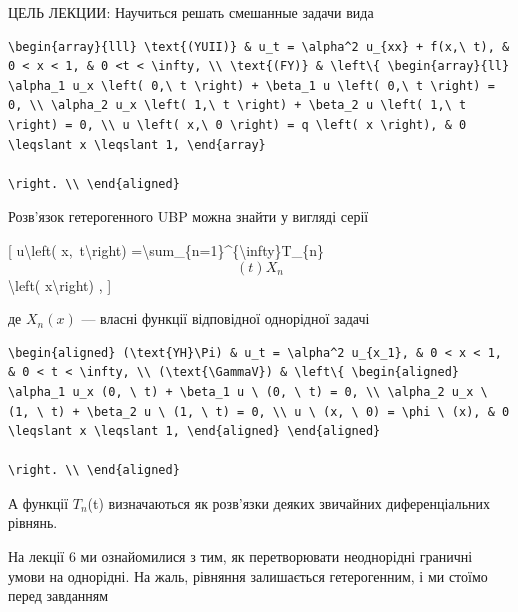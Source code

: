 \documentclass[
]{article}
\begin{document}
{{ЦЕЛЬ ЛЕКЦИИ: Научиться решать смешанные задачи вида

\begin{verbatim}
\begin{array}{lll} \text{(YUII)} & u_t = \alpha^2 u_{xx} + f(x,\ t), & 0 < x < 1, & 0 <t < \infty, \\ \text{(FY)} & \left\{ \begin{array}{ll} \alpha_1 u_x \left( 0,\ t \right) + \beta_1 u \left( 0,\ t \right) = 0, \\ \alpha_2 u_x \left( 1,\ t \right) + \beta_2 u \left( 1,\ t \right) = 0, \\ u \left( x,\ 0 \right) = q \left( x \right), & 0 \leqslant x \leqslant 1, \end{array}

\right. \\ \end{aligned}
\end{verbatim}

Розв'язок гетерогенного UBP можна знайти у вигляді серії

{[} u\textbackslash left( x,~t\textbackslash right)
=\textbackslash sum\_\{n=1\}\^{}\{\textbackslash infty\}T\_\{n\}\[\left( t\right)X_{n}\]\textbackslash left(
x\textbackslash right) , {]}

де \(X_n\left(x\right)\) --- власні функції відповідної однорідної
задачі

\begin{verbatim}
\begin{aligned} (\text{YH}\Pi) & u_t = \alpha^2 u_{x_1}, & 0 < x < 1, & 0 < t < \infty, \\ (\text{\GammaV}) & \left\{ \begin{aligned} \alpha_1 u_x (0, \ t) + \beta_1 u \ (0, \ t) = 0, \\ \alpha_2 u_x \ (1, \ t) + \beta_2 u \ (1, \ t) = 0, \\ u \ (x, \ 0) = \phi \ (x), & 0 \leqslant x \leqslant 1, \end{aligned} \end{aligned}

\right. \\ \end{aligned}
\end{verbatim}

А функції \(T_n\)(t) визначаються як розв'язки деяких звичайних
диференціальних рівнянь.

На лекції 6 ми ознайомилися з тим, як перетворювати неоднорідні граничні
умови на однорідні. На жаль, рівняння залишається гетерогенним, і ми
стоїмо перед завданням

}}
\end{document}
